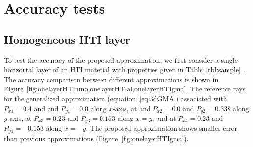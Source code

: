 





\section{Accuracy tests}
\subsection{Homogeneous HTI layer}
To test the accuracy of the proposed approximation, we first consider a single horizontal layer of an HTI material  with properties given in Table~\ref{tbl:sample} . The accuracy comparison between different approximations is shown in Figure~\ref{fig:onelayerHTInmo,onelayerHTIal,onelayerHTIgma}. The reference rays for the generalized approximation (equation~\ref{eq:3dGMA})  associated with $P_{x1} = 0.4$ and and $P_{y1}=0.0$ along $x$-axis, at and $P_{x2}=0.0$ and $P_{y2} = 0.338$ along $y$-axis, at $P_{x3}=0.23$ and $P_{y3}=0.153$ along $x=y$, and at $P_{x4}=0.23$ and $P_{y4}=-0.153$ along $x=-y$. The proposed approximation shows smaller error than previous approximations (Figure~\ref{fig:onelayerHTIgma}). 

